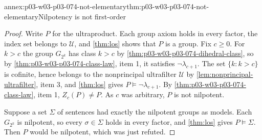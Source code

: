 \begin{annexitem}{annex:p03-w03-p03-074-not-elementary}{thm:p03-w03-p03-074-not-elementary}{Nilpotency is not first-order}
\begin{proof}
Write \(P\) for the ultraproduct. Each group axiom holds in every factor,
the index set belongs to \(\mathcal U\), and \cref{thm:los} shows
that \(P\) is a group. Fix \(c\ge0\). For \(k>c\) the group
\(G_{2^k}\) has class \(k>c\) by
\cref{thm:p03-w03-p03-074-dihedral-class}, so by
\cref{thm:p03-w03-p03-074-class-law}, item 1, it satisfies
\(\neg\lambda_{c+1}\). The set \(\{k:k>c\}\) is cofinite, hence belongs to
the nonprincipal ultrafilter \(\mathcal U\) by
\cref{lem:nonprincipal-ultrafilter}, item 3, and \cref{thm:los}
gives \(P\models\neg\lambda_{c+1}\). By
\cref{thm:p03-w03-p03-074-class-law}, item 1, \(Z_c(P)\neq P\). As
\(c\) was arbitrary, \(P\) is not nilpotent.

Suppose a set \(\Sigma\) of sentences had exactly the nilpotent groups as
models. Each \(G_{2^k}\) is nilpotent, so every \(\sigma\in\Sigma\) holds
in every factor, and \cref{thm:los} gives \(P\models\Sigma\). Then
\(P\) would be nilpotent, which was just refuted.
\end{proof}
\end{annexitem}
